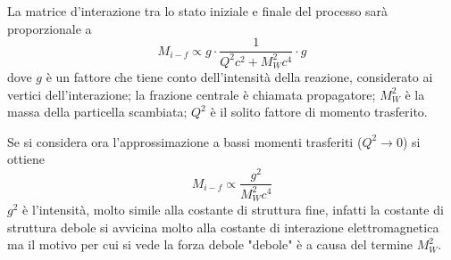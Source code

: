 La matrice d'interazione tra lo stato iniziale e finale del processo sarà proporzionale a 
\begin{equation}
M_{i-f}\propto g\cdot \frac{1}{Q^2c^2+M^2_Wc^4}\cdot g
\end{equation}
dove $g$ è un fattore che tiene conto dell'intensità della reazione, considerato ai vertici dell'interazione; la frazione centrale è chiamata propagatore; $M^2_W$ è la massa della particella scambiata; $Q^2$ è il solito fattore di momento trasferito.

Se si considera ora l'approssimazione a bassi momenti trasferiti ($Q^2\to 0$) si ottiene
\begin{equation}
M_{i-f}\propto \frac{g^2}{M^2_Wc^4}
\end{equation}
$g^2$ è l'intensità, molto simile alla costante di struttura fine, infatti la costante di struttura debole si avvicina molto alla costante di interazione elettromagnetica ma il motivo per cui si vede la forza debole "debole" è a causa del termine $M^2_W$.


